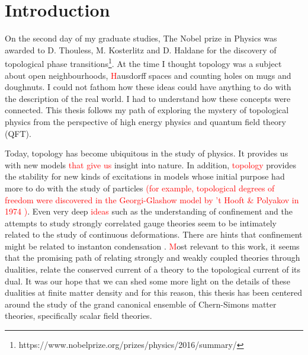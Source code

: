 
    \graphicspath{{Introduction_Folder/figures/PNG/}{Introduction_Folder/figures/PDF/}{Introduction_Folder/figures/}}

\chapter*{Introduction}


On the second day of my graduate studies, The Nobel prize in Physics was awarded to D. Thouless, M. Kosterlitz and D. Haldane for the discovery of topological phase transitions\footnote{https://www.nobelprize.org/prizes/physics/2016/summary/}. At the time I thought topology was a subject about open neighbourhoods, \textcolor{red}{H}ausdorff spaces and counting holes on mugs and doughnuts. I could not fathom how these ideas could have anything to do with the description of the real world. I had to understand how these concepts were connected. This thesis follows my path of exploring the mystery of topological physics from the perspective of high energy physics and quantum field theory (QFT).

Today, topology has become ubiquitous in the study of physics. It provides us with new models \textcolor{red}{that give us} insight into nature. In addition, \textcolor{red}{topology} provides the stability for new kinds of excitations in models whose initial purpose had more to do with the study of particles \textcolor{red}{(for example, topological degrees of freedom were discovered in the Georgi-Glashow model \cite{Georgi:1974sy} by 't Hooft \& Polyakov in 1974 \cite{Polyakov:1974ek, tHooft:1974kcl})}. Even very deep \textcolor{red}{ideas} such as the understanding of confinement and the attempts to study strongly correlated gauge theories seem to be intimately related to the study of continuous deformations. There are hints that confinement might be related to instanton condensation \cite{Polyakov:1976fu}. \colorbox{red}{ } \textcolor{red}{M}ost relevant to this work, it seems that the promising path of relating strongly and weakly coupled theories through dualities, relate the conserved current of a theory to the topological current of its dual. It was our hope that we can shed some more light on the details of these dualities at finite matter density and for this reason, this thesis has been centered around the study of the grand canonical ensemble of Chern-Simons matter theories, specifically scalar field theories.

